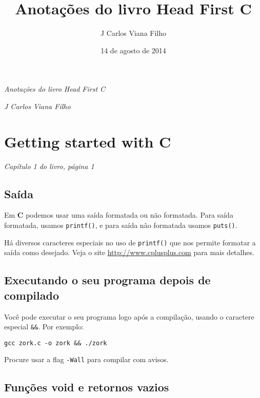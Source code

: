 \documentclass[12pt, a4paper]{article}
\title{Anotações do livro Head First C}
\author{J Carlos Viana Filho}
\date{14 de agosto de 2014}
\begin{document}

\begin{center}
\textsl{\LARGE Anotações do livro Head First C}
\end{center}

\begin{flushright}
\emph{J Carlos Viana Filho}
\end{flushright}


\tableofcontents

\newpage


\section{Getting started with C}
\begin{flushright}
\textit{Capítulo 1 do livro, página 1}
\end{flushright}

\subsection{Saída}

Em \textbf{C} podemos usar uma saída formatada ou não formatada. Para saída formatada, usamos \verb|printf()|, e para saída não formatada usamos \verb|puts()|.

Há diversos caracteres especiais no uso de \verb|printf()| que nos permite formatar a saída como desejado. Veja o site \url{http://www.cplusplus.com} para mais detalhes.

\subsection{Executando o seu programa depois de compilado}

Você pode executar o seu programa logo após a compilação, usando o caractere especial \verb|&&|. Por exemplo:

\begin{verbatim}
gcc zork.c -o zork && ./zork
\end{verbatim}

Procure usar a flag \verb|-Wall| para compilar com avisos.

\subsection{Funções void e retornos vazios}
\end{document}
